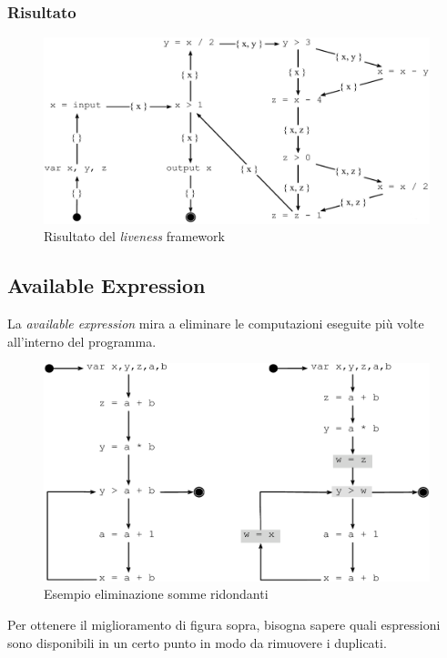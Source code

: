 \subsubsection{Risultato}
\begin{figure}[H]
  \centering
  \includegraphics[scale=0.4]{res/image/example_liveness}
  \caption{Risultato del \textit{liveness} framework}
  \label{img:example_liveness}
\end{figure}

\subsection{Available Expression}
La \textit{available expression} mira a eliminare le computazioni eseguite
pi\`u volte all'interno del programma.

\begin{figure}[H]
  \centering
  \includegraphics[scale=0.35]{res/image/redundant_sum}
  \caption{Esempio eliminazione somme ridondanti}
  \label{img:redundant_sum}
\end{figure}

Per ottenere il miglioramento di figura sopra, bisogna sapere quali espressioni
sono disponibili in un certo punto in modo da rimuovere i duplicati.

